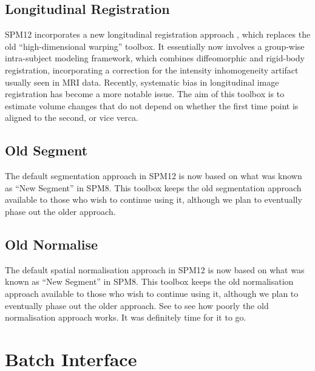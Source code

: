 \documentclass[a4paper,titlepage,openany]{article}
\begin{document}
\begin{multicols}{2}
\subsection{Longitudinal Registration}
SPM12 incorporates a new longitudinal registration approach \cite{ashburner2013symmetric}, which replaces the old ``high-dimensional warping'' toolbox.
It essentially now involves a group-wise intra-subject modeling framework, which combines diffeomorphic \cite{ashburner2011diffeomorphic} and rigid-body registration, incorporating a correction for the intensity inhomogeneity artifact usually seen in MRI data.
Recently, systematic bias in longitudinal image registration has become a more notable issue.
The aim of this toolbox is to estimate volume changes that do not depend on whether the first time point is aligned to the second, or vice verca.

\subsection{Old Segment}
The default segmentation approach in SPM12 is now based on what was known as ``New Segment'' in SPM8.
This toolbox keeps the old segmentation approach available to those who wish to continue using it, although we plan to eventually phase out the older approach.

\subsection{Old Normalise}
The default spatial normalisation approach in SPM12 is now based on what was known as ``New Segment'' in SPM8.
This toolbox keeps the old normalisation approach available to those who wish to continue using it, although we plan to eventually phase out the older approach.
See \cite{klein_evaluation} to see how poorly the old normalisation approach works.
It was definitely time for it to go.

\section{Batch Interface}




\end{multicols}
\end{document}
